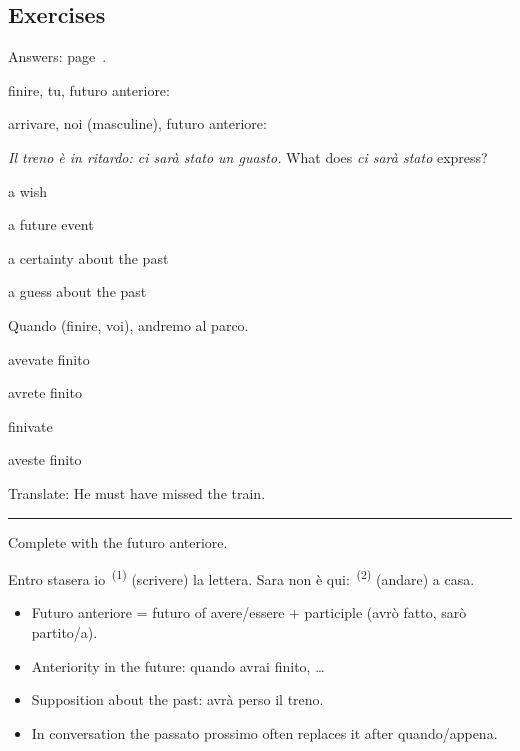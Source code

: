 \documentclass[11pt,a4paper,twoside,openright]{book}
\newcommand{\blank}{\underline{\hspace{2.6cm}}}
\newcommand{\clozeblank}[1]{\underline{\hspace{2.4cm}}\textsuperscript{\,(#1)}}
\newcommand{\answerline}{\par\vspace{6pt}\noindent\rule{0.75\linewidth}{0.4pt}\par}
\begin{document}
\subsection*{Exercises}\label{les:futuro-anteriore:exercises}
{\color{muted}\small Answers: page~\pageref{ans:futuro-anteriore}.}

\begin{exercises}
\item\label{ex:futuro-anteriore-1}\relax finire, tu, futuro anteriore: \blank{}
\item\label{ex:futuro-anteriore-2}\relax arrivare, noi (masculine), futuro anteriore: \blank{}
\item\label{ex:futuro-anteriore-3}\relax \textit{Il treno è in ritardo: ci sarà stato un guasto.} What does \textit{ci sarà stato} express?\par\nopagebreak\begin{options}
\item\relax a wish
\item\relax a future event
\item\relax a certainty about the past
\item\relax a guess about the past
\end{options}
\item\label{ex:futuro-anteriore-4}\relax Quando \blank{} (finire, voi), andremo al parco.\par\nopagebreak\begin{options}
\item\relax avevate finito
\item\relax avrete finito
\item\relax finivate
\item\relax aveste finito
\end{options}
\item\label{ex:futuro-anteriore-5}\relax Translate: He must have missed the train.\par\answerline
\item\label{ex:futuro-anteriore-6}\relax Complete with the futuro anteriore.\par\smallskip\begingroup\setlength{\parindent}{0pt}Entro stasera io \clozeblank{1} (scrivere) la lettera. Sara non è qui: \clozeblank{2} (andare) a casa.\par\endgroup
\end{exercises}

\begin{summarybox}
\begin{itemize}
\item\relax Futuro anteriore = futuro of avere/essere + participle (avrò fatto, sarò partito/a).
\item\relax Anteriority in the future: quando avrai finito, …
\item\relax Supposition about the past: avrà perso il treno.
\item\relax In conversation the passato prossimo often replaces it after quando/appena.
\end{itemize}
\end{summarybox}
\end{document}
